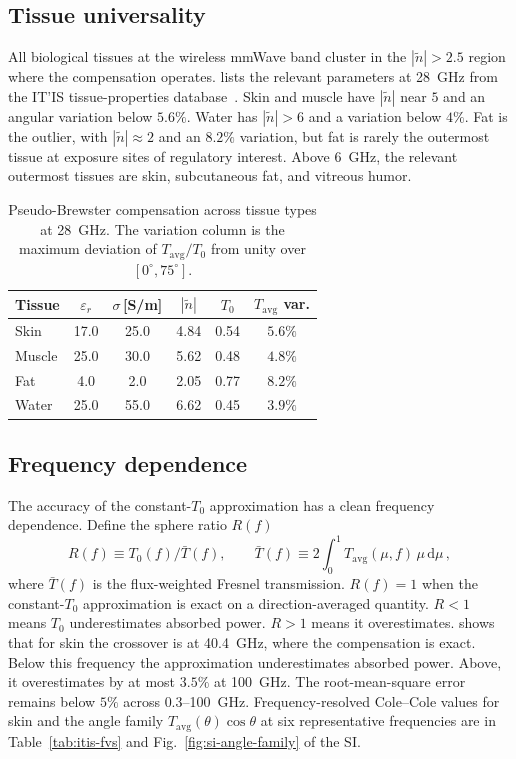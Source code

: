 \documentclass[journal,twocolumn,10pt]{IEEEtran}
\theoremstyle{plain}
\newcommand{\Tavg}{T_{\mathrm{avg}}}
\newcommand{\Tbar}{\bar{T}}
\newcommand{\ntilde}{\tilde{n}}
\newcommand{\diff}{\mathrm{d}}
\begin{document}
\subsection{Tissue universality}\label{subsec:pB-tissues}

All biological tissues at the wireless mmWave band cluster in the
$|\ntilde| > 2.5$ region where the compensation operates.
 lists the relevant parameters at 28~GHz from
the IT'IS tissue-properties database~\cite{ITISv5,Gabriel1996}. Skin and
muscle have $|\ntilde|$ near $5$ and an angular variation below
$5.6\%$. Water has $|\ntilde| > 6$ and a variation below $4\%$.
Fat is the outlier, with $|\ntilde| \approx 2$ and an $8.2\%$
variation, but fat is rarely the outermost tissue at exposure sites
of regulatory interest. Above $6$~GHz, the relevant outermost
tissues are skin, subcutaneous fat, and vitreous humor.

\begin{table}[!t]
\centering
\caption{Pseudo-Brewster compensation across tissue types at
28~GHz. The variation column is the maximum deviation of
$\Tavg/T_0$ from unity over $[0^\circ, 75^\circ]$.}
\label{tab:materials}
\begin{tabular}{lccccc}
\toprule
Tissue & $\varepsilon_r$ & $\sigma$\,[S/m] & $|\ntilde|$ & $T_0$
  & $\Tavg$ var. \\
\midrule
Skin   & 17.0 & 25.0 & 4.84 & 0.54 & $5.6\%$ \\
Muscle & 25.0 & 30.0 & 5.62 & 0.48 & $4.8\%$ \\
Fat    &  4.0 &  2.0 & 2.05 & 0.77 & $8.2\%$ \\
Water  & 25.0 & 55.0 & 6.62 & 0.45 & $3.9\%$ \\
\bottomrule
\end{tabular}
\end{table}

\subsection{Frequency dependence}\label{subsec:pB-freq}

The accuracy of the constant-$T_0$ approximation has a clean
frequency dependence. Define the sphere ratio $R(f)$
\begin{equation}\label{eq:R-of-f}
  R(f) \equiv T_0(f) / \Tbar(f),
  \qquad
  \Tbar(f) \equiv 2\int_0^1 \Tavg(\mu, f)\,\mu\,\diff\mu\,,
\end{equation}
where $\Tbar(f)$ is the flux-weighted Fresnel transmission. $R(f) =
1$ when the constant-$T_0$ approximation is exact on a
direction-averaged quantity. $R < 1$ means $T_0$ underestimates
absorbed power. $R > 1$ means it overestimates. 
shows that for skin the crossover is at 40.4~GHz, where the
compensation is exact. Below this
frequency the approximation underestimates absorbed power. Above, it
overestimates by at most $3.5\%$ at 100~GHz. The root-mean-square error
remains below $5\%$ across $0.3$--100~GHz. Frequency-resolved
Cole--Cole values for skin and the angle family
$\Tavg(\theta)\cos\theta$ at six representative frequencies are in
Table~\ref{tab:itis-fvs} and Fig.~\ref{fig:si-angle-family} of the SI.
\end{document}
